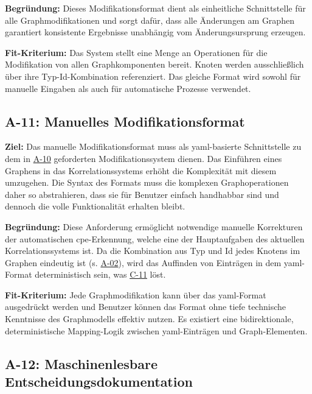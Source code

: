 \textbf{Begründung:}
Dieses Modifikationsformat dient als einheitliche Schnittstelle für alle Graphmodifikationen und sorgt dafür, dass alle Änderungen am Graphen garantiert konsistente Ergebnisse unabhängig vom Änderungsursprung erzeugen.

\textbf{Fit-Kriterium:}
Das System stellt eine Menge an Operationen für die Modifikation von allen Graphkomponenten bereit.
Knoten werden ausschließlich über ihre Typ-Id-Kombination referenziert.
Das gleiche Format wird sowohl für manuelle Eingaben als auch für automatische Prozesse verwendet.

\subsection{A-11: Manuelles Modifikationsformat}\label{subsec:req-manual-format-modification-for-real}

\textbf{Ziel:}
Das manuelle Modifikationsformat muss als \acrshort{yaml}-basierte Schnittstelle zu dem in \hyperref[subsec:req-manual-format-modification]{A-10} geforderten Modifikationssystem dienen.
Das Einführen eines Graphens in das Korrelationssystems erhöht die Komplexität mit diesem umzugehen.
Die Syntax des Formats muss die komplexen Graphoperationen daher so abstrahieren, dass sie für Benutzer einfach handhabbar sind und dennoch die volle Funktionalität erhalten bleibt.

\textbf{Begründung:}
Diese Anforderung ermöglicht notwendige manuelle Korrekturen der automatischen \acrshort{cpe}-Erkennung, welche eine der Hauptaufgaben des aktuellen Korrelationssystems ist.
Da die Kombination aus Typ und Id jedes Knotens im Graphen eindeutig ist (s. \hyperref[subsec:req-node-id-type]{A-02}), wird das Auffinden von Einträgen in dem \acrshort{yaml}-Format deterministisch sein, was \hyperref[subsec:c-11-finding-yaml-entries]{C-11} löst.

\textbf{Fit-Kriterium:}
Jede Graphmodifikation kann über das \acrshort{yaml}-Format ausgedrückt werden und Benutzer können das Format ohne tiefe technische Kenntnisse des Graphmodells effektiv nutzen.
Es existiert eine bidirektionale, deterministische Mapping-Logik zwischen \acrshort{yaml}-Einträgen und Graph-Elementen.

\subsection{A-12: Maschinenlesbare Entscheidungsdokumentation}\label{subsec:req-reason-format}

